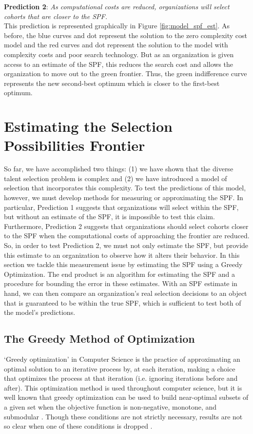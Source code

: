\noindent \textbf{Prediction 2}: \emph{As computational costs are reduced, organizations will select cohorts that are closer to the SPF.} \\

This prediction is represented graphically in Figure \ref{fig:model_spf_est}. As before, the blue curves and dot represent the solution to the zero complexity cost model and the red curves and dot represent the solution to the model with complexity costs and poor search technology. But as an organization is given access to an estimate of the SPF, this reduces the search cost and allows the organization to move out to the green frontier. Thus, the green indifference curve represents the new second-best optimum which is closer to the first-best optimum. 

\section{Estimating the Selection Possibilities Frontier} \label{sec:spf_alg}
So far, we have accomplished two things: (1) we have shown that the diverse talent selection problem is complex and (2) we have introduced a model of selection that incorporates this complexity. To test the predictions of this model, however, we must develop methods for measuring or approximating the SPF. In particular, Prediction 1 suggests that organizations will select within the SPF, but without an estimate of the SPF, it is impossible to test this claim. Furthermore, Prediction 2 suggests that organizations should select cohorts closer to the SPF when the computational costs of approaching the frontier are reduced. So, in order to test Prediction 2, we must not only estimate the SPF, but provide this estimate to an organization to observe how it alters their behavior. In this section we tackle this measurement issue by estimating the SPF using a Greedy Optimization. The end product is an algorithm for estimating the SPF and a procedure for bounding the error in these estimates. With an SPF estimate in hand, we can then compare an organization's real selection decisions to an object that is guaranteed to be within the true SPF, which is sufficient to test both of the model's predictions.


\subsection{The Greedy Method of Optimization}
`Greedy optimization' in Computer Science is the practice of approximating an optimal solution to an iterative process by, at each iteration, making a choice that optimizes the process at that iteration (i.e. ignoring iterations before and after). This optimization method is used throughout computer science, but it is well known that greedy optimization can be used to build near-optimal subsets of a given set when the objective function is non-negative, monotone, and submodular \cite{Feldman_Harshaw_Karbasi_2017,nemhauser1978analysis}. Though these conditions are not strictly necessary, results are not so clear when one of these conditions is dropped \cite{Feldman_Harshaw_Karbasi_2017}.

